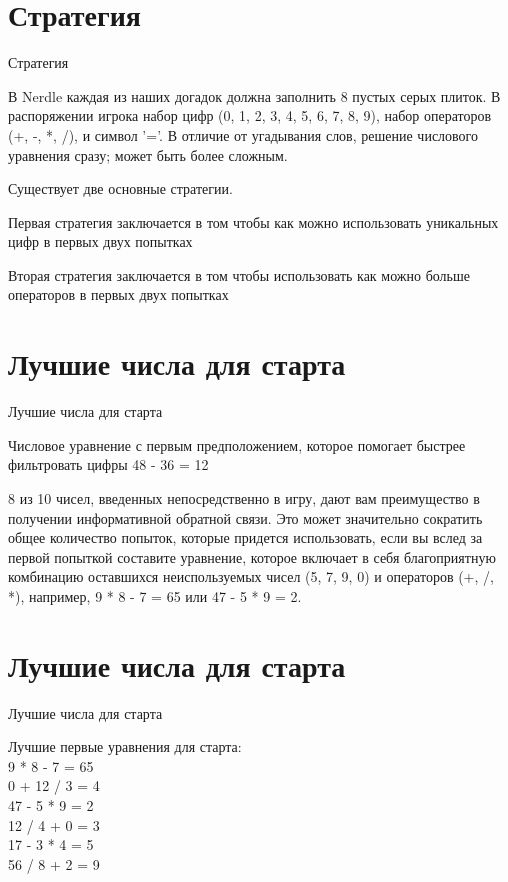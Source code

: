 \documentclass[handout]{beamer}
\begin{document}
    \section{Стратегия}
    \begin{frame}{Стратегия}
         \item В Nerdle каждая из наших догадок должна заполнить 8 пустых серых плиток. В распоряжении игрока набор цифр (0, 1, 2, 3, 4, 5, 6, 7, 8, 9), набор операторов (+, -, *, /), и символ '='. В отличие от угадывания слов, решение числового уравнения сразу; может быть более сложным.
         \item Существует две основные стратегии. 
         \item Первая стратегия заключается в том чтобы как можно использовать уникальных цифр в первых двух попытках
         \item Вторая стратегия заключается в том чтобы использовать как можно больше операторов в первых двух попытках
    \end{frame}
    
    \section{Лучшие числа для старта}
    \begin{frame}{Лучшие числа для старта}
        \item Числовое уравнение с первым предположением, которое помогает быстрее фильтровать цифры 
           48 - 36 = 12
        \item 8 из 10 чисел, введенных непосредственно в игру, дают вам преимущество в получении информативной обратной связи. Это может значительно сократить общее количество попыток, которые  придется использовать, если вы вслед за первой попыткой составите уравнение, которое включает в себя благоприятную комбинацию оставшихся неиспользуемых чисел (5, 7, 9, 0) и операторов (+, /, *), например, 9 * 8 - 7 = 65 или 47 - 5 * 9 = 2.
    \end{frame}
    
    \section{Лучшие числа для старта}
    \begin{frame}{Лучшие числа для старта}
        \item Лучшие первые уравнения для старта: \\9 * 8 - 7 = 65 \\0 + 12 / 3 = 4 \\47 - 5 * 9 = 2 \\12 / 4 + 0 = 3 \\17 - 3 * 4 = 5 \\56 / 8 + 2 = 9
    \end{frame}
    
\end{document}
